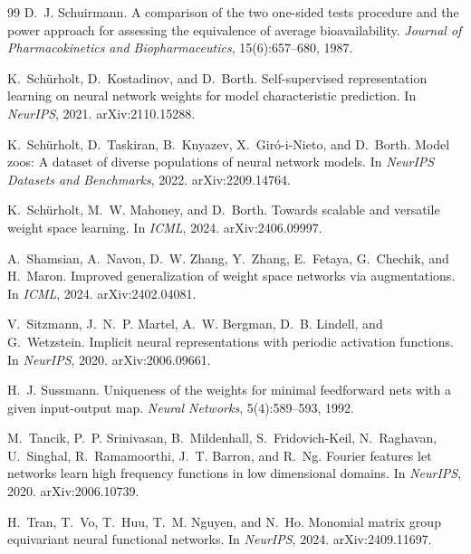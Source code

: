 \documentclass[10pt,letterpaper]{article}
\theoremstyle{definition}
\begin{document}
\begin{thebibliography}{99}
D.~J. Schuirmann.
\newblock A comparison of the two one-sided tests procedure and the power approach for assessing
the equivalence of average bioavailability.
\newblock \emph{Journal of Pharmacokinetics and Biopharmaceutics}, 15(6):657--680, 1987.

K.~Sch\"urholt, D.~Kostadinov, and D.~Borth.
\newblock Self-supervised representation learning on neural network weights for model
characteristic prediction.
\newblock In \emph{NeurIPS}, 2021. arXiv:2110.15288.

K.~Sch\"urholt, D.~Taskiran, B.~Knyazev, X.~Gir\'o-i-Nieto, and D.~Borth.
\newblock Model zoos: A dataset of diverse populations of neural network models.
\newblock In \emph{NeurIPS Datasets and Benchmarks}, 2022. arXiv:2209.14764.

K.~Sch\"urholt, M.~W. Mahoney, and D.~Borth.
\newblock Towards scalable and versatile weight space learning.
\newblock In \emph{ICML}, 2024. arXiv:2406.09997.

A.~Shamsian, A.~Navon, D.~W. Zhang, Y.~Zhang, E.~Fetaya, G.~Chechik, and H.~Maron.
\newblock Improved generalization of weight space networks via augmentations.
\newblock In \emph{ICML}, 2024. arXiv:2402.04081.

V.~Sitzmann, J.~N.~P. Martel, A.~W. Bergman, D.~B. Lindell, and G.~Wetzstein.
\newblock Implicit neural representations with periodic activation functions.
\newblock In \emph{NeurIPS}, 2020. arXiv:2006.09661.

H.~J. Sussmann.
\newblock Uniqueness of the weights for minimal feedforward nets with a given input-output map.
\newblock \emph{Neural Networks}, 5(4):589--593, 1992.

M.~Tancik, P.~P. Srinivasan, B.~Mildenhall, S.~Fridovich-Keil, N.~Raghavan, U.~Singhal,
R.~Ramamoorthi, J.~T. Barron, and R.~Ng.
\newblock Fourier features let networks learn high frequency functions in low dimensional domains.
\newblock In \emph{NeurIPS}, 2020. arXiv:2006.10739.

H.~Tran, T.~Vo, T.~Huu, T.~M. Nguyen, and N.~Ho.
\newblock Monomial matrix group equivariant neural functional networks.
\newblock In \emph{NeurIPS}, 2024. arXiv:2409.11697.


\end{thebibliography}
\end{document}
